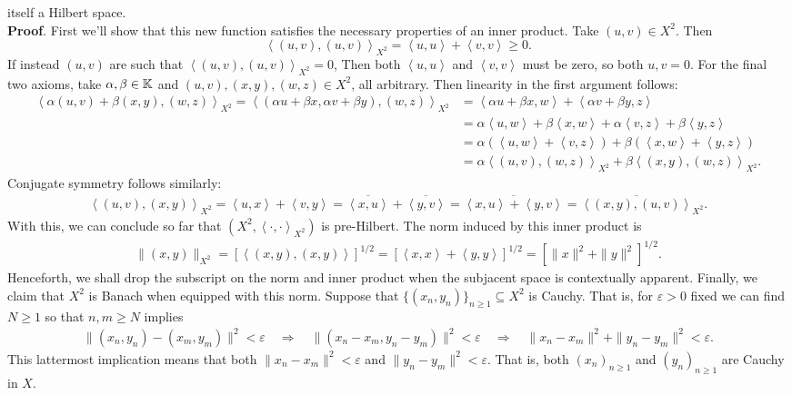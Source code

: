 \documentclass[10pt]{article}
\newcommand{\1}[1]{\mathbbm{1}_{#1}} \newcommand{\mc}[1]{\mathcal{#1}}
\newcommand{\ip}[2]{\left\langle#1,#2\right\rangle }
\begin{document}
    itself a Hilbert space.\\[5pt]
    {\bf Proof}. First we'll show that this new function satisfies the necessary
    properties of an inner product. Take $(u,v)\in X^2$. Then
    \[\ip{(u,v)}{(u,v)}_{X^2}=\ip{u}{u}+\ip{v}{v}\geq0.\] If instead $(u,v)$ are
    such that $\ip{(u,v)}{(u,v)}_{X^2}=0$, Then both $\ip{u}{u}$ and $\ip{v}{v}$
    must be zero, so both $u,v=0$. For the final two axioms, take
    $\alpha,\beta\in\mathbb{K}$ and $(u,v),(x,y),(w,z)\in X^2$, all arbitrary. Then
    linearity in the first argument follows:
    \begin{align*}
        \ip{\alpha(u,v)+\beta(x,y)}{(w,z)}_{X^2}=\ip{(\alpha u+\beta x, \alpha v+\beta y)}{(w,z)}_{X^2}&=\ip{\alpha u+\beta x}{w}+\ip{\alpha v+\beta y}{z}\\
        &=\alpha\ip{u}{w}+\beta\ip{x}{w}+\alpha\ip{v}{z}+\beta\ip{y}{z}\\
        &=\alpha(\ip{u}{w}+\ip{v}{z})+\beta(\ip{x}{w}+\ip{y}{z})\\
        &=\alpha\ip{(u,v)}{(w,z)}_{X^2}+\beta\ip{(x,y)}{(w,z)}_{X^2}.
    \end{align*}
    Conjugate symmetry follows similarly:
    \begin{align*}
        \ip{(u,v)}{(x,y)}_{X^2}=\ip{u}{x}+\ip{v}{y}=\overline{\ip{x}{u}}+\overline{\ip{y}{v}}=\overline{\ip{x}{u}+\ip{y}{v}}=\overline{\ip{(x,y)}{(u,v)}}_{X^2}.
    \end{align*}
    With this, we can conclude so far that $(X^2,\ip{\cdot}{\cdot}_{X^2})$ is
    pre-Hilbert. The norm induced by this inner product is
    \begin{align*}
        \|(x,y)\|_{X^2}=\left[\ip{(x,y)}{(x,y)}\right]^{1/2}=\left[\ip{x}{x}+\ip{y}{y}\right]^{1/2}=\left[\|x\|^2+\|y\|^2\right]^{1/2}.
    \end{align*}
    Henceforth, we shall drop the subscript on the norm and inner product when
    the subjacent space is contextually apparent. Finally, we claim that $X^2$ is Banach when equipped with this norm. 
    Suppose that $\{(x_n,y_n)\}_{n\geq 1}\subseteq X^2$ is Cauchy. That is, for $\varepsilon>0$ fixed we can find $N\geq 1$ so that $n,m\geq N$ implies
    \begin{align*}
        \|(x_n,y_n)-(x_m,y_m)\|^2<\varepsilon\quad\Rightarrow\quad \|(x_n-x_m, y_n-y_m)\|^2<\varepsilon\quad\Rightarrow\quad\|x_n-x_m\|^2+\|y_n-y_m\|^2<\varepsilon.
    \end{align*}
    This lattermost implication means that both $\|x_n-x_m\|^2<\varepsilon$ and $\|y_n-y_m\|^2<\varepsilon$. That is, both $(x_n)_{n\geq 1}$ and $(y_n)_{n\geq 1}$ are Cauchy in $X$.
\end{document}
